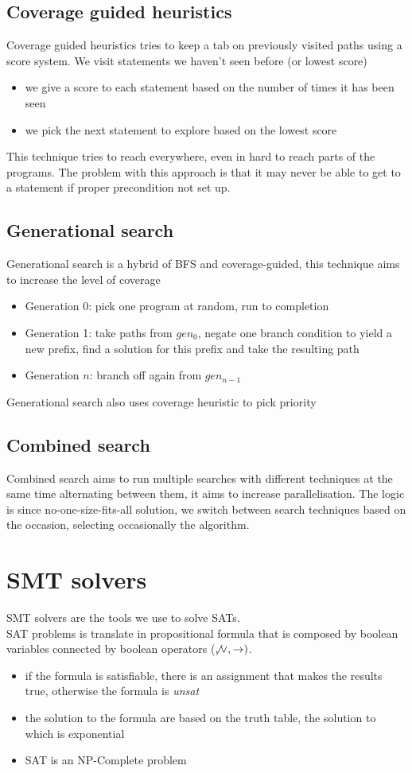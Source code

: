 \documentclass[11pt, oneside]{article}   	%
\begin{document}
\subsection*{Coverage guided heuristics}
Coverage guided heuristics tries to keep a tab on previously visited paths using a score system. We visit statements we haven't seen before (or lowest score)
\begin{itemize}
\item we give a score to each statement based on the number of times it has been seen
\item we pick the next statement to explore based on the lowest score
\end{itemize}
This technique tries to reach everywhere, even in hard to reach parts of the programs. The problem with this approach is that it may never be able to get to a statement if proper precondition not set up.

\subsection*{Generational search}
Generational search is a hybrid of BFS and coverage-guided, this technique aims to increase the level of coverage
\begin{itemize}
\item Generation 0: pick one program at random, run to completion
\item Generation 1: take paths from $gen_0$, negate one branch condition to yield a new prefix, find a solution for this prefix and take the resulting path
\item Generation $n$: branch off again from $gen_{n-1}$
\end{itemize}
Generational search also uses coverage heuristic to pick priority

\subsection*{Combined search}
Combined search aims to run multiple searches with different techniques at the same time alternating between them, it aims to increase parallelisation. The logic is since no-one-size-fits-all solution, we switch between search techniques based on the occasion, selecting occasionally the algorithm.

\section*{SMT solvers}
SMT solvers are the tools we use to solve SATs.\\
SAT problems is translate in propositional formula that is composed by boolean variables connected by boolean operators ($\not, \lor, \rightarrow)$. \begin{itemize}
\item if the formula is satisfiable, there is an assignment that makes the results true, otherwise the formula is \emph{unsat}
\item the solution to the formula are based on the truth table, the solution to which is exponential
\item SAT is an NP-Complete problem
\end{itemize}
\end{document}
